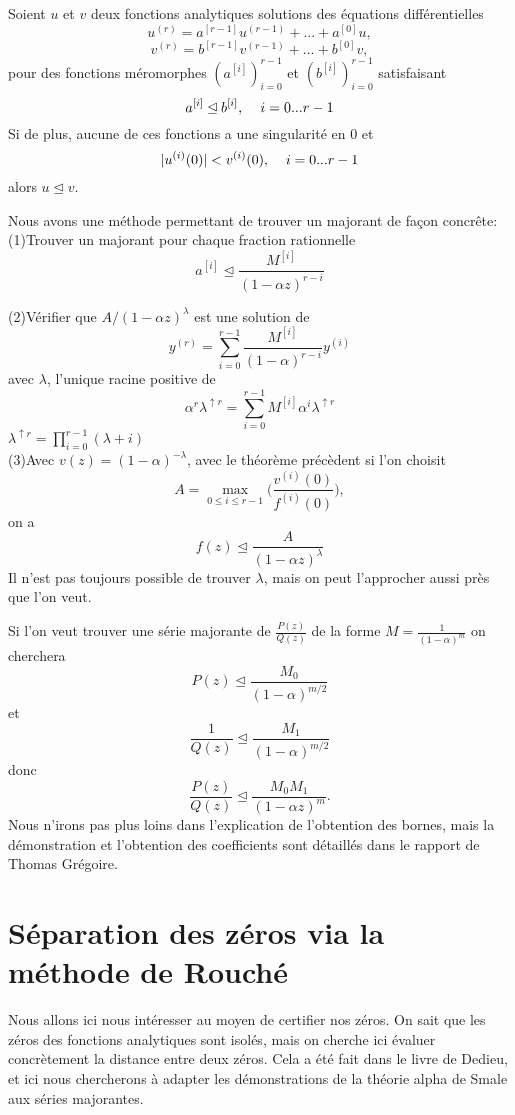 \documentclass[a4paper,10.5pt]{article}
\begin{document}
	\begin{theorem}
		Soient $u$ et $v$ deux fonctions analytiques solutions des équations différentielles
		\[u^{(r)}=a^{[r-1]}u^{(r-1)}+...+a^{[0]}u,\]
		\[v^{(r)}=b^{[r-1]}v^{(r-1)}+...+b^{[0]}v,\]
		pour des fonctions méromorphes $(a^{[i]})_{i=0}^{r-1}$ et $(b^{[i]})_{i=0}^{r-1}$ satisfaisant 
		\[a^{[i]} \unlhd b^{[i]}, \hspace{4mm} i=0...r-1\]
		Si de plus, aucune de ces fonctions a une singularité en 0 et
		\[|u^{(i)}(0)|<v^{(i)}(0),\hspace{4mm} i=0...r-1\] 
		alors $u\unlhd v$.
	\end{theorem}
	Nous avons une méthode permettant de trouver un majorant de façon concrête:\\
	
	(1)Trouver un majorant pour chaque fraction rationnelle 
	\[a^{[i]} \unlhd \frac{M^{[i]}}{(1-\alpha z)^{r-i}}\]
	
	(2)Vérifier que $A/(1-\alpha z)^\lambda$ est une solution de 
	\[y^{(r)}=\sum_{i=0}^{r-1}\frac{M^{[i]}}{(1-\alpha)^{r-i}}y^{(i)}\]
	avec $\lambda$, l'unique racine positive de\[\alpha^{r}\lambda^{\uparrow r}=\sum_{i=0}^{r-1}{M^{[i]}}\alpha^i\lambda^{\uparrow r} \]
	$\lambda^{\uparrow r}=\prod_{i=0}^{r-1}(\lambda+i)$\\
	
	(3)Avec $v(z)=(1-\alpha)^{-\lambda}$, avec le théorème précèdent si l'on choisit
	\[A=\max_{0\leq i\leq r-1}\Big(\frac{v^{(i)}(0)}{f^{(i)}(0)}\Big),\]
	on a
	\[f(z)\unlhd  \frac{A}{(1-\alpha z)^\lambda}\]
	Il n'est pas toujours possible de trouver $\lambda$, mais on peut l'approcher aussi près que l'on veut. 
	\vspace{3mm}
	
	\noindent Si l'on veut trouver une série majorante de $\frac{P(z)}{Q(z)}$ de la forme $M=\frac{1}{(1-\alpha)^m}$ on cherchera 
	\[P(z)\unlhd \frac{M_0}{(1-\alpha)^{m/2}}\]
	et 
	\[\frac{1}{Q(z)}\unlhd \frac{M_1}{(1-\alpha)^{m/2}}\]
	donc 
	\[\frac{P(z)}{Q(z)}\unlhd \frac{M_0M_1}{(1-\alpha z)^{m}}.\]
	Nous n'irons pas plus loins dans l'explication de l'obtention des bornes, mais la démonstration et l'obtention des coefficients sont détaillés dans le rapport de Thomas Grégoire.
	\newpage


	
	\section{Séparation des zéros via la méthode de Rouché}
	Nous allons ici nous intéresser au moyen de certifier nos zéros. On sait que les zéros des fonctions analytiques sont isolés, mais on cherche ici évaluer concrètement la distance entre deux zéros. Cela a été fait dans le livre de Dedieu, et ici nous chercherons à adapter les démonstrations de la théorie alpha de Smale aux séries majorantes.
	
\end{document}
